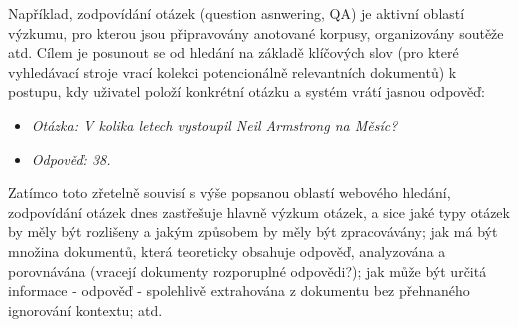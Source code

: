 \documentclass[]{../../metanetpaper}
\begin{document}
\begin{multicols}{2}
Například, zodpovídání otázek (question asnwering, QA) je aktivní oblastí výzkumu, pro kterou jsou připravovány anotované korpusy, organizovány soutěže atd. Cílem je posunout se od hledání na základě klíčových slov (pro které vyhledávací stroje vrací kolekci potencionálně relevantních dokumentů) k postupu, kdy uživatel položí konkrétní otázku a systém vrátí jasnou odpověď:\\
\begin{itemize}
\item[] \textit{Otázka: V kolika letech vystoupil Neil Armstrong na Měsíc?}
\item[] \textit{Odpověď: 38.}
\end{itemize}
Zatímco toto zřetelně souvisí s výše popsanou oblastí webového hledání, zodpovídání otázek dnes zastřešuje hlavně výzkum otázek, a sice jaké typy otázek by měly být rozlišeny a jakým způsobem by měly být zpracovávány; jak má být množina dokumentů, která teoreticky obsahuje odpověď, analyzována a porovnávána (vracejí dokumenty rozporuplné odpovědi?); jak může být určitá informace - odpověď - spolehlivě extrahována z dokumentu bez přehnaného ignorování kontextu; atd.


\end{multicols}
\end{document}
